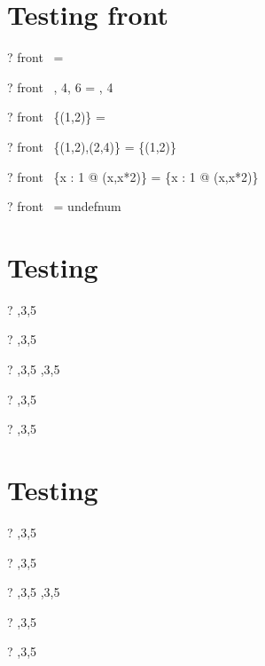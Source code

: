 \documentclass{article}
\begin{document}
\section{Testing front}
\begin{zed} \vdash? front~  \rangle = \emptyset \end{zed}
\begin{zed} \vdash? front~ , 4, 6 \rangle = , 4 \rangle \end{zed}
\begin{zed} \vdash? front~ \{(1,2)\} = \emptyset \end{zed}
\begin{zed} \vdash? front~ \{(1,2),(2,4)\} = \{(1,2)\} \end{zed}
\begin{zed} \vdash? front~ \{x : 1  @ (x,x*2)\} = \{x : 1  @ (x,x*2)\} \end{zed}
\begin{zed} \vdash? front~ \emptyset[(\num,\nat)] = undefnum \end{zed}


\section{Testing \prefix}
\begin{zed} \vdash? \langle \rangle  \prefix   {},3,5 \rangle \end{zed}
\begin{zed} \vdash?  \rangle  \prefix   {},3,5 \rangle \end{zed}
\begin{zed} \vdash? ,3,5 \rangle  \prefix   {},3,5 \rangle \end{zed}
\begin{zed} \vdash? \lnot {} \rangle  \prefix   {},3,5 \rangle \end{zed}
\begin{zed} \vdash? \lnot {} \rangle  \prefix   {},3,5 \rangle \end{zed}

\section{Testing \suffix}
\begin{zed} \vdash? \langle \rangle  \suffix   {},3,5 \rangle \end{zed}
\begin{zed} \vdash?  \rangle  \suffix   {},3,5 \rangle \end{zed}
\begin{zed} \vdash? ,3,5 \rangle  \suffix   {},3,5 \rangle \end{zed}
\begin{zed} \vdash? \lnot {} \rangle  \suffix   {},3,5 \rangle \end{zed}
\begin{zed} \vdash? \lnot {} \rangle  \suffix   {},3,5 \rangle \end{zed}
\end{document}
